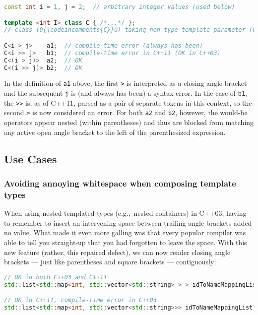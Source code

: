 \begin{lstlisting}[language=C++]
const int i = 1, j = 2;  // arbitrary integer values (used below)

template <int I> class C { /*...*/ };
// class (ù{\codeincomments{C}}ù) taking non-type template parameter (ù{\codeincomments{I}}ù) of type (ù{\codeincomments{int}}ù)

C<i > j>    a1;  // compile-time error (always has been)
C<i >> j>   b1;  // compile-time error in C++11 (OK in C++03)
C<(i > j)>  a2;  // OK
C<(i >> j)> b2;  // OK
\end{lstlisting}


\noindent In the definition of \texttt{a1} above, the first \texttt{>} is
interpreted as a closing angle bracket and the subsequent \texttt{j} is
(and always has been) a syntax error. In the case of \texttt{b1}, the
\texttt{>>} is, as of C++11, parsed as a pair of separate tokens in this
context, so the second \texttt{>} is now considered an error. For
both \texttt{a2} and \texttt{b2}, however, the would-be operators appear
nested (within parentheses) and thus are blocked from matching any
active open angle bracket to the left of the parenthesized expression.

\subsection[Use Cases]{Use Cases}\label{use-cases}

\subsubsection[Avoiding annoying whitespace when composing template types]{Avoiding annoying whitespace when composing template types}\label{avoiding-annoying-whitespace-when-composing-template-types}

When using nested templated types (e.g.,~nested containers) in C++03,
having to remember to insert an intervening space between trailing angle
brackets added no value. What made it even more galling was that every
popular compiler was able to tell you straight-up that you had forgotten
to leave the space. With this new
feature (rather, this repaired defect), we can now render closing angle
brackets --- just like parentheses and square brackets --- contiguously:

\begin{lstlisting}[language=C++]
// OK in both C++03 and C++11
std::list<std::map<int, std::vector<std::string> > > idToNameMappingList;

// OK in C++11, compile-time error in C++03
std::list<std::map<int, std::vector<std::string>>> idToNameMappingList;
\end{lstlisting}


